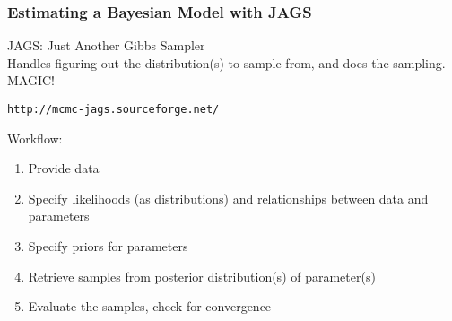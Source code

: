 \documentclass{beamer}
\begin{document}

\begin{frame}[fragile]
\frametitle{Estimating a Bayesian Model with JAGS}

JAGS: Just Another Gibbs Sampler\\
Handles figuring out the distribution(s) to sample from, and does the sampling. MAGIC!\\
\begin{verbatim}
http://mcmc-jags.sourceforge.net/
\end{verbatim}

\medskip
Workflow:
\begin{enumerate}
\item Provide data
\item Specify likelihoods (as distributions) and relationships between data and parameters
\item Specify priors for parameters
\item Retrieve samples from posterior distribution(s) of parameter(s) 
\item Evaluate the samples, check for convergence
\end{enumerate}
\end{frame}






\end{document}
